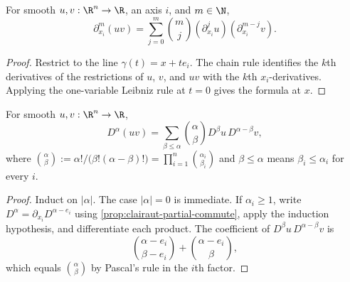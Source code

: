 \begin{proposition}
\label{prop:iterated-leibniz-one-axis}
\leanok
For smooth $u,v : \R^n \to \R$, an axis $i$, and $m\in\N$,
\[
\partial_{x_i}^m(uv)=\sum_{j=0}^m\binom{m}{j}
(\partial_{x_i}^j u)(\partial_{x_i}^{m-j}v).
\]
\end{proposition}
\begin{proof}
\leanok
\sketch
Restrict to the line $\gamma(t)=x+te_i$. The chain rule identifies the
$k$th derivatives of the restrictions of $u$, $v$, and $uv$ with the
$k$th $x_i$-derivatives. Applying the one-variable Leibniz rule at $t=0$
gives the formula at $x$.
\end{proof}

\begin{proposition}
\label{prop:leibniz-formula}
\leanok
For smooth $u,v : \R^n \to \R$,
\[
D^\alpha(uv)=\sum_{\beta\leq\alpha}\binom{\alpha}{\beta}
D^\beta u\,D^{\alpha-\beta}v,
\]
where
$\binom{\alpha}{\beta}:=\alpha!/\bigl(\beta!(\alpha-\beta)!\bigr)
=\prod_{i=1}^n\binom{\alpha_i}{\beta_i}$ and
$\beta\leq\alpha$ means $\beta_i\leq\alpha_i$ for every $i$.
\end{proposition}
\begin{proof}
\leanok
\sketch
Induct on $|\alpha|$. The case $|\alpha|=0$ is immediate. If
$\alpha_i\geq1$, write $D^\alpha=\partial_{x_i}D^{\alpha-e_i}$ using
\cref{prop:clairaut-partial-commute}, apply the induction hypothesis, and
differentiate each product. The coefficient of
$D^\beta u\,D^{\alpha-\beta}v$ is
\[
\binom{\alpha-e_i}{\beta-e_i}+\binom{\alpha-e_i}{\beta},
\]
which equals $\binom{\alpha}{\beta}$ by Pascal's rule in the $i$th factor.
\end{proof}

